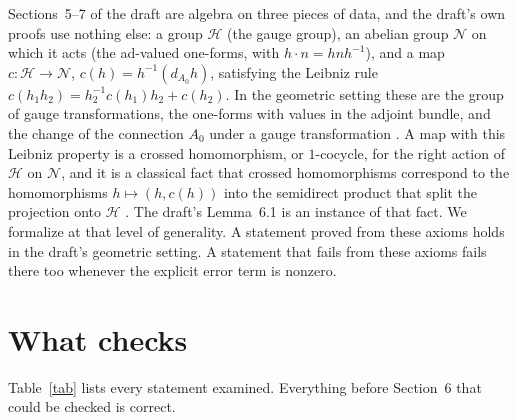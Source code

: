 \documentclass[11pt]{article}
\theoremstyle{remark}
\newcommand{\dA}{d_{A_0}}
\begin{document}
Sections~5--7 of the draft are algebra on three pieces of data, and the draft's own proofs use
nothing else: a group $\mathcal H$ (the gauge group), an abelian group $\mathcal N$ on which it
acts (the ad-valued one-forms, with $h\cdot n = h n h^{-1}$), and a map
$c:\mathcal H\to\mathcal N$, $c(h)=h^{-1}(\dA h)$, satisfying the Leibniz rule
$c(h_1h_2)=h_2^{-1}c(h_1)h_2+c(h_2)$. In the geometric setting these are the group of gauge
transformations, the one-forms with values in the adjoint bundle, and the change of the
connection $A_0$ under a gauge transformation \cite[Section~2.1]{DK}. A map with this Leibniz
property is a crossed homomorphism, or $1$-cocycle, for the right action of $\mathcal H$ on
$\mathcal N$, and it is a classical fact that crossed homomorphisms correspond to the
homomorphisms $h\mapsto(h,c(h))$ into the semidirect product that split the projection onto
$\mathcal H$ \cite[Chapter~IV, Section~2]{Brown}. The draft's Lemma~6.1 is an instance of that
fact. We formalize at that level of generality. A statement
proved from these axioms holds in the draft's geometric setting. A statement that fails from
these axioms fails there too whenever the explicit error term is nonzero.

\section{What checks}

Table~\ref{tab} lists every statement examined. Everything before Section~6 that could be
checked is correct.
\end{document}
